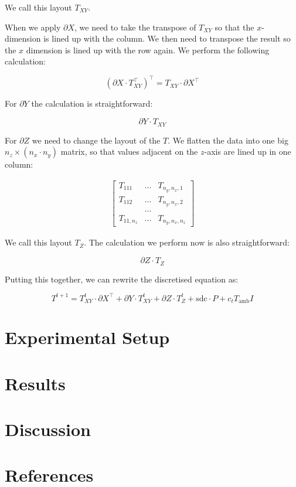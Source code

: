 We call this layout \(T_{XY}\).

When we apply \(\partial X\), we need to take the transpose of
\(T_{XY}\) so that the \(x\)-dimension is lined up with the column. We
then need to transpose the result so the \(x\) dimension is lined up
with the row again. We perform the following calculation:

\[
\left( \partial X \cdot T^{\intercal}_{XY} \right)^{\intercal} =  T_{XY} \cdot\partial X^{\intercal}
\]

For \(\partial Y\) the calculation is straightforward:

\[
\partial Y \cdot T_{XY}
\]

For \(\partial Z\) we need to change the layout of the \(T\). We flatten
the data into one big \(n_z \times (n_x \cdot n_y)\) matrix, so that
values adjacent on the \(z\)-axis are lined up in one column:

\begin{align}
    \begin{bmatrix}
    T_{111} &\ldots &T_{n_y,n_x,1} \\
    T_{112} &\ldots &T_{n_y,n_x,2} \\
    &\ldots \\
    T_{11,n_z} &\ldots & T_{n_y,n_x,n_z}
    \end{bmatrix}
\end{align}

We call this layout \(T_Z\). The calculation we perform now is also
straightforward:

\[
\partial Z \cdot T_{Z}
\]

Putting this together, we can rewrite the discretised equation as:

\[
T^{t+1} = T^{t}_{XY} \cdot \partial X^{\intercal} + \partial Y \cdot T^{t}_{XY} + \partial Z \cdot T^t_Z + \text{sdc} \cdot P + c_t T_{\text{amb}} I
\]

\hypertarget{experimental-setup}{%
\section{Experimental Setup}\label{experimental-setup}}

\hypertarget{results}{%
\section{Results}\label{results}}

\hypertarget{discussion}{%
\section{Discussion}\label{discussion}}

\hypertarget{references}{%
\section{References}\label{references}}
